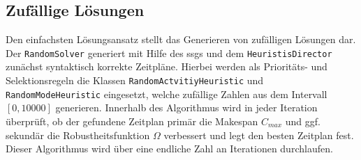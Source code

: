\subsection{Zufällige Lösungen} \label{subsec:Naiv_Random}

Den einfachsten Lösungsansatz stellt das Generieren von zufälligen Lösungen dar. Der \lstinline|RandomSolver| generiert mit Hilfe des \ac{ssgs} und dem \lstinline|HeuristisDirector| zunächst syntaktisch korrekte Zeitpläne. Hierbei werden als Prioritäts- und Selektionsregeln die Klassen \lstinline|RandomActvitiyHeuristic| und  \lstinline|RandomModeHeuristic| eingesetzt, welche zufällige Zahlen aus dem Intervall $[0, 10000]$ generieren. Innerhalb des Algorithmus wird in jeder Iteration überprüft, ob der gefundene Zeitplan primär die Makespan $C_{max}$ und ggf. sekundär die Robustheitsfunktion $\Omega$ verbessert und legt den besten Zeitplan fest. Dieser Algorithmus wird über eine endliche Zahl an Iterationen durchlaufen. 